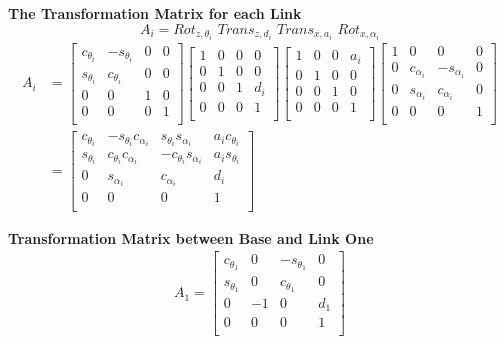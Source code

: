 \documentclass[12pt,a4paper]{article}
\begin{document}
\textbf{The Transformation Matrix for each Link} \\
	\[ A_i = Rot_{z,\theta_i} \,\, Trans_{z,d_i} \,\, Trans_{x,a_i} \,\, Rot_{x, \alpha_i} \]
	\begin{align*}
		A_i &= \begin{bmatrix}
			c_{\theta_i} & -s_{\theta_i} & 0 & 0 \\
			s_{\theta_i} & c_{\theta_i} & 0 & 0 \\
			0 & 0 & 1 & 0 \\
			0 & 0 & 0 & 1 \\
		\end{bmatrix}\begin{bmatrix}
			1 & 0 & 0 & 0 \\
			0 & 1 & 0 & 0 \\
			0 & 0 & 1 & d_i \\
			0 & 0 & 0 & 1 \\
		\end{bmatrix}\begin{bmatrix}
			1 & 0 & 0 & a_i \\
			0 & 1 & 0 & 0 \\
			0 & 0 & 1 & 0 \\
			0 & 0 & 0 & 1 \\
		\end{bmatrix}\begin{bmatrix}
			1 & 0 & 0 & 0 \\
			0 & c_{\alpha_i} & -s_{\alpha_i} & 0  \\
			0& s_{\alpha_i} & c_{\alpha_i} & 0 \\
			0 & 0 & 0 & 1 \\
		\end{bmatrix} \\
		&= \begin{bmatrix}
		 c_{\theta_i} & -s_{\theta_i}c_{\alpha_i} & s_{\theta_i}s_{\alpha_i} & a_ic_{\theta_i}\\
		 s_{\theta_i} & c_{\theta_i}c_{\alpha_i} & -c_{\theta_i}s_{\alpha_i} & a_is_{\theta_i}\\
		 0 & s_{\alpha_i} & c_{\alpha_i} & d_i\\
		 0 & 0 & 0 & 1\\
		\end{bmatrix}
	\end{align*}

	\textbf{Transformation Matrix between Base and Link One}
	\begin{align*}
	A_1= \begin{bmatrix}
		 c_{\theta_1} & 0 & -s_{\theta_1} & 0\\
		 s_{\theta_1} & 0 & c_{\theta_1} & 0\\
		 0 & -1 & 0 & d_1\\
		 0 & 0 & 0 & 1\\
		\end{bmatrix}
	\end{align*}
	
\end{document}
